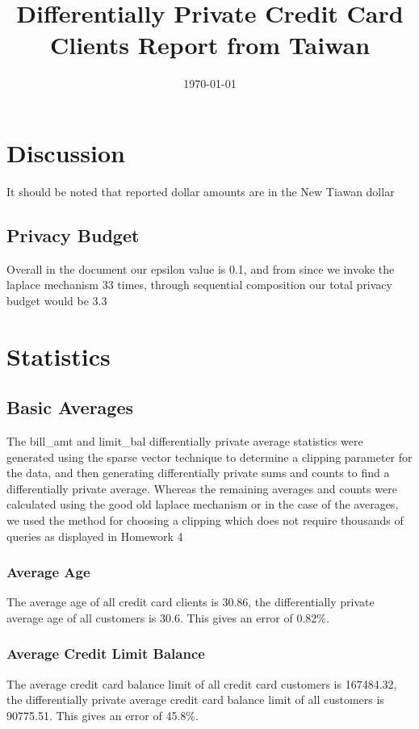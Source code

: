 \documentclass{article}%
\title{Differentially Private Credit Card Clients Report from Taiwan}%
\date{\today}%
\begin{document}
%
\normalsize%
\maketitle%
\section{Discussion}%
\label{sec:Discussion}%
It should be noted that reported dollar amounts are in the New Tiawan dollar%
\subsection{Privacy Budget}%
\label{subsec:PrivacyBudget}%
Overall in the document our epsilon value is 0.1, and from since we invoke the laplace mechanism 33 times, through sequential composition our total privacy budget would be 3.3

%
\section{Statistics}%
\label{sec:Statistics}%
\subsection{Basic Averages}%
\label{subsec:BasicAverages}%
The bill\_amt and limit\_bal differentially private average statistics were generated using the sparse vector technique to determine a clipping parameter for the data, and then generating differentially private sums and counts to find a differentially private average.%
Whereas the remaining averages and counts were calculated using the good old laplace mechanism or in the case of the averages, we used the method for choosing a clipping which does not require thousands of queries as displayed in Homework 4%
\subsubsection{Average Age}%
\label{ssubsec:AverageAge}%
The average age of all credit card clients is 30.86, the differentially private average age of all customers is 30.6. This gives an error of 0.82\%.

%
\subsubsection{Average Credit Limit Balance}%
\label{ssubsec:AverageCreditLimitBalance}%
The average credit card balance limit of all credit card customers is 167484.32, the differentially private average credit card balance limit of all customers is 90775.51. This gives an error of 45.8\%.
\end{document}
